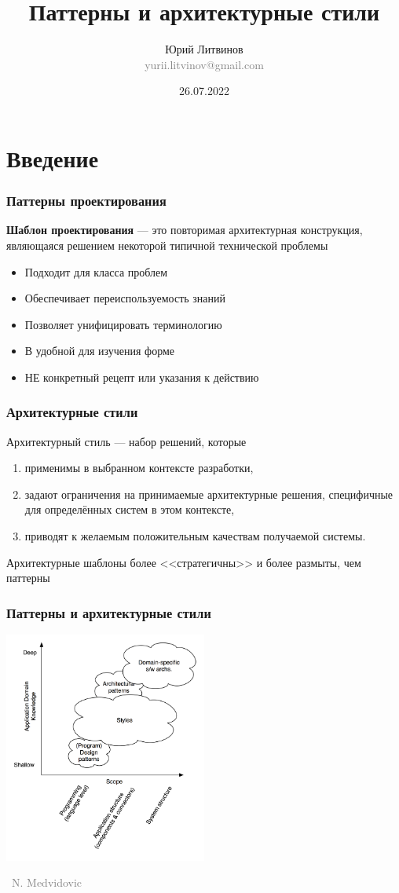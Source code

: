\documentclass[xetex,mathserif,serif]{beamer}
\title{Паттерны и архитектурные стили}
\author[Юрий Литвинов]{Юрий Литвинов\\\small{\textcolor{gray}{yurii.litvinov@gmail.com}}}
\date{26.07.2022}
\newcommand{\attribution}[1] {
    \vspace{-5mm}\begin{flushright}\begin{scriptsize}\textcolor{gray}{\textcopyright\, #1}\end{scriptsize}\end{flushright}
}
\begin{document}
    \frame{\titlepage}

    \section{Введение}

    \begin{frame}
        \frametitle{Паттерны проектирования}
        \textbf{Шаблон проектирования} --- это повторимая архитектурная конструкция, являющаяся решением некоторой типичной технической проблемы
        \begin{itemize}
            \item Подходит для класса проблем
            \item Обеспечивает переиспользуемость знаний
            \item Позволяет унифицировать терминологию
            \item В удобной для изучения форме
            \item НЕ конкретный рецепт или указания к действию
        \end{itemize}
    \end{frame}
 
    \begin{frame}
        \frametitle{Архитектурные стили}
        Архитектурный стиль --- набор решений, которые
        \begin{enumerate}
            \item применимы в выбранном контексте разработки,
            \item задают ограничения на принимаемые архитектурные решения, специфичные для определённых систем в этом контексте,
            \item приводят к желаемым положительным качествам получаемой системы.
        \end{enumerate}
        Архитектурные шаблоны более <<стратегичны>> и более размыты, чем паттерны
    \end{frame}

    \begin{frame}
        \frametitle{Паттерны и архитектурные стили}
        \begin{center}
            \includegraphics[width=0.5\textwidth]{architecturalStyles.png}
            \attribution{N. Medvidovic}
        \end{center}
    \end{frame}
\end{document}
